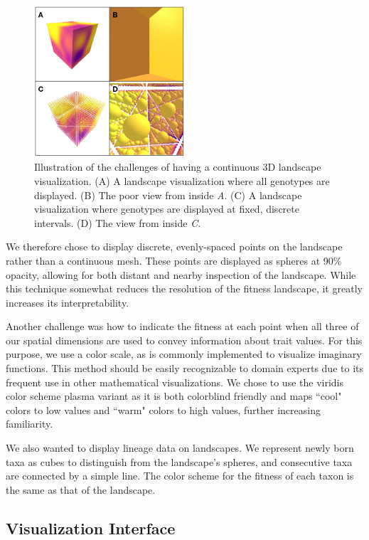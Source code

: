 \begin{figure}
    \centering
    \includegraphics[width=0.5\textwidth]{chapters/3-vr-viz/figs/spheres.png}
    \caption{Illustration of the challenges of having a continuous 3D landscape visualization. (A) A landscape visualization where all genotypes are displayed. (B) The poor view from inside \textit{A}. (C) A landscape visualization where genotypes are displayed at fixed, discrete intervals. (D) The view from inside \textit{C}.}
    \label{fig:imp:spheres}
\end{figure}

We therefore chose to display discrete, evenly-spaced points on the landscape rather than a continuous mesh. These points are displayed as spheres at 90\% opacity, allowing for both distant and nearby inspection of the landscape. While this technique somewhat reduces the resolution of the fitness landscape, it greatly increases its interpretability. 

Another challenge was how to indicate the fitness at each point when all three of our spatial dimensions are used to convey information about trait values. For this purpose, we use a color scale, as is commonly implemented to visualize imaginary functions. This method should be easily recognizable to domain experts due to its frequent use in other mathematical visualizations. We chose to use the viridis color scheme plasma variant as it is both colorblind friendly and maps ``cool" colors to low values and ``warm" colors to high values, further increasing familiarity.

We also wanted to display lineage data on landscapes. We represent newly born taxa as cubes to distinguish from the landscape's spheres, and consecutive taxa are connected by a simple line. The color scheme for the fitness of each taxon is the same as that of the landscape. 

\subsection{Visualization Interface}


